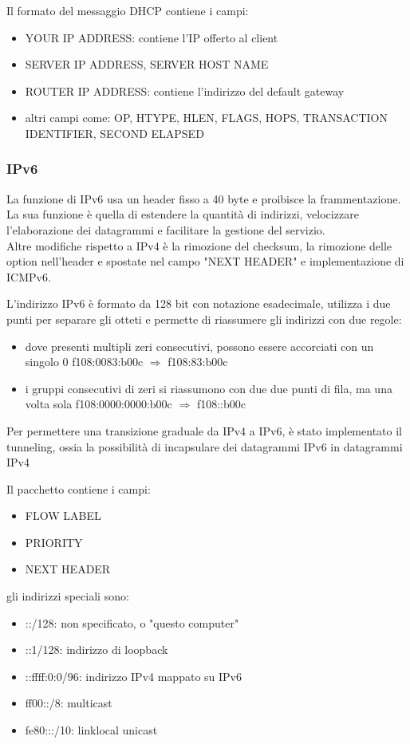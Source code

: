\documentclass[12pt, a4paper]{article}
\begin{document}
Il formato del messaggio DHCP contiene i campi:
\begin{itemize}
   \item YOUR IP ADDRESS: contiene l'IP offerto al client
   \item SERVER IP ADDRESS, SERVER HOST NAME
   \item ROUTER IP ADDRESS: contiene l'indirizzo del default gateway
   \item altri campi come: OP, HTYPE, HLEN, FLAGS, HOPS, TRANSACTION IDENTIFIER, SECOND ELAPSED
\end{itemize}

\subsubsection{IPv6}
La funzione di IPv6 usa un header fisso a 40 byte e proibisce la frammentazione. La sua funzione è quella di estendere
la quantità di indirizzi, velocizzare l'elaborazione dei datagrammi e facilitare la gestione del servizio.\\Altre 
modifiche rispetto a IPv4 è la rimozione del checksum, la rimozione delle option nell'header e spostate nel campo
"NEXT HEADER" e implementazione di ICMPv6.

L'indirizzo IPv6 è formato da 128 bit con notazione esadecimale, utilizza i due punti per separare gli otteti e 
permette di riassumere gli indirizzi con due regole:
\begin{itemize}
    \item dove presenti multipli zeri consecutivi, possono essere accorciati con un singolo 0
    \subitem f108:0083:b00c $\Rightarrow$ f108:83:b00c 
    \item i gruppi consecutivi di zeri si riassumono con due due punti di fila, ma una volta sola
    \subitem  f108:0000:0000:b00c $\Rightarrow$ f108::b00c
\end{itemize}

Per permettere una transizione graduale da IPv4 a IPv6, è stato implementato il tunneling, ossia la possibilità di
incapsulare dei datagrammi IPv6 in datagrammi IPv4

Il pacchetto contiene i campi:
\begin{itemize}
    \item FLOW LABEL
    \item PRIORITY 
    \item NEXT HEADER
\end{itemize}

gli indirizzi speciali sono: 
\begin{itemize}
    \item ::/128: non specificato, o "questo computer"
    \item ::1/128: indirizzo di loopback
    \item ::ffff:0:0/96: indirizzo IPv4 mappato su IPv6
    \item ff00::/8: multicast
    \item fe80:::/10: linklocal unicast
\end{itemize}
\end{document}

